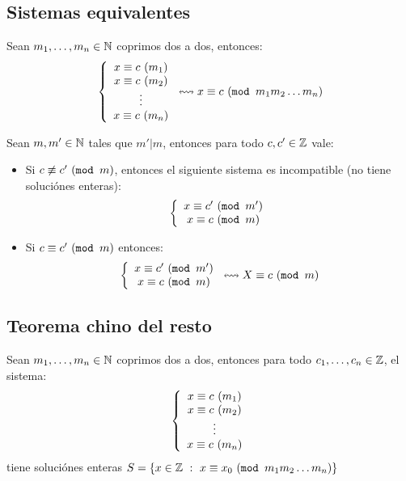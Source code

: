\subsection{Sistemas equivalentes}
Sean $m_1,\dots,m_n\in\mathbb{N}$ coprimos dos a dos, entonces:
\begin{equation*}
    \left\{
        \begin{array}{c}
            x \equiv c ~(m_1)\\
            x \equiv c ~(m_2)\\
            \vdots\\
            x \equiv c ~(m_n)
        \end{array}
    \right. \leftrightsquigarrow x \equiv c ~(\texttt{mod } m_1m_2\dots m_n)
\end{equation*}

Sean $m,m'\in\mathbb{N}$ tales que $m'|m$, entonces para todo $c,c'\in\mathbb{Z}$ vale:
\begin{itemize}
\item Si $c \not\equiv c' ~(\texttt{mod } m)$, entonces el siguiente sistema es incompatible (no tiene soluciónes enteras):
$$\left\{
\begin{array}{c}
x \equiv c' ~(\texttt{mod } m') \\
x \equiv c ~(\texttt{mod } m)\\
\end{array}
\right.
$$
\item Si $c \equiv c' ~(\texttt{mod } m)$ entonces:
$$\left\{
\begin{array}{c}
x \equiv c' ~(\texttt{mod } m') \\
x \equiv c ~(\texttt{mod } m)\\
\end{array}
\right.\leftrightsquigarrow X \equiv c ~(\texttt{mod } m)
$$
\end{itemize}

\subsection{Teorema chino del resto}
Sean $m_1,\dots,m_n\in\mathbb{N}$ coprimos dos a dos, entonces para todo $c_1,\dots,c_n\in\mathbb{Z}$, el sistema:
\begin{equation*}
    \left\{
        \begin{array}{c}
            x \equiv c ~(m_1)\\
            x \equiv c ~(m_2)\\
            \vdots\\
            x \equiv c ~(m_n)
        \end{array}
    \right.
\end{equation*}
tiene soluciónes enteras $S=\{x\in\mathbb{Z}~:~x \equiv x_0 ~(\texttt{mod } m_1m_2\dots m_n)\}$

